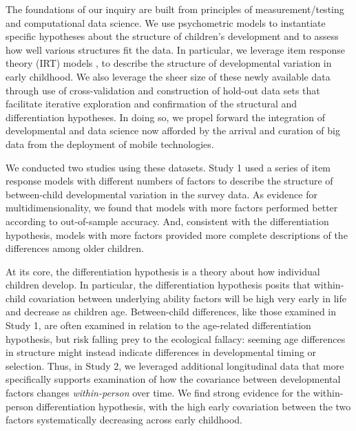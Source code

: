 \documentclass[man, floatsintext]{apa7}
\begin{document}
The foundations of our inquiry are built from  principles of
measurement/testing and computational data science. We use psychometric
models to instantiate specific hypotheses about the structure of children's development
and to assess how well various structures ﬁt the data. In particular, we
leverage item response theory (IRT) models \parencite[first developed by
Educational Testing Service to measure students' academic performance;][]{lord1980}, to describe the structure of developmental variation in early
childhood. We also leverage the sheer size of these newly available data
through use of cross-validation and construction of hold-out data sets
that facilitate iterative exploration and confirmation of the structural
and differentiation hypotheses. In doing so, we propel forward the
integration of developmental and data science now afforded by the
arrival and curation of big data from the deployment of mobile technologies.

We conducted two studies using these datasets. Study 1 used a series
of item response models with different numbers of factors to describe
the structure of between-child developmental variation in the survey
data. As evidence for multidimensionality, we found that models with
more factors performed better according to out-of-sample accuracy. And,
consistent with the differentiation hypothesis, models with more factors
provided more complete descriptions of the differences among older
children.

At its core, the differentiation hypothesis is a theory about how
individual children develop. In particular, the differentiation
hypothesis posits that within-child covariation between underlying ability
factors will be high very early in life and decrease as children age.
Between-child differences, like those examined in Study 1, are often
examined in relation to the age-related differentiation hypothesis, but
risk falling prey to the ecological fallacy: seeming age differences in structure might
instead indicate differences in developmental timing or selection. Thus,
in Study 2, we leveraged additional longitudinal data that more
specifically supports examination of how the covariance between
developmental factors changes \emph{within-person} over time.
We find strong evidence for the
within-person differentiation hypothesis, with the high early
covariation between the two factors systematically decreasing across
early childhood.
\end{document}
